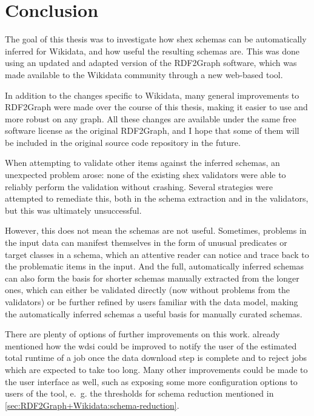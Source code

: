 
\chapter{Conclusion}
\label{ch:Conclusion}

The goal of this thesis was to investigate how \gls{shex} \glspl{schema} can be automatically inferred for \gls{Wikidata},
and how useful the resulting \glspl{schema} are.
This was done using an updated and adapted version of the \gls{RDF2Graph} software,
which was made available to the \gls{Wikidata} community
through a new web-based tool.

In addition to the changes specific to \gls{Wikidata},
many general improvements to \gls{RDF2Graph} were made over the course of this thesis,
making it easier to use and more robust on any graph.
All these changes are available under the same free software license as the original \gls{RDF2Graph},
and I hope that some of them will be included in the original source code repository in the future.

When attempting to validate other \glspl{item} against the inferred \glspl{schema},
an unexpected problem arose:
none of the existing \gls{shex} validators were able to reliably perform the validation without crashing.
Several strategies were attempted to remediate this,
both in the \gls{schema} extraction and in the validators,
but this was ultimately unsuccessful.

However, this does not mean the \glspl{schema} are not useful.
Sometimes, problems in the input data can manifest themselves
in the form of unusual \glspl{predicate} or target classes in a \gls{schema},
which an attentive reader can notice and trace back to the problematic \glspl{item} in the input.
And the full, automatically inferred \glspl{schema}
can also form the basis for shorter \glspl{schema} manually extracted from the longer ones,
which can either be validated directly
(now without problems from the validators)
or be further refined by users familiar with the data model,
making the automatically inferred \glspl{schema} a useful basis for manually curated \glspl{schema}.

There are plenty of options of further improvements on this work.
 already mentioned how the \gls{wdsi} could be improved
to notify the user of the estimated total runtime of a \gls{job} once the data download step is complete
and to reject \glspl{job} which are expected to take too long.
Many other improvements could be made to the user interface as well,
such as exposing some more configuration options to users of the tool,
e.~g. the thresholds for \gls{schema} reduction mentioned in \cref{sec:RDF2Graph+Wikidata:schema-reduction}.

